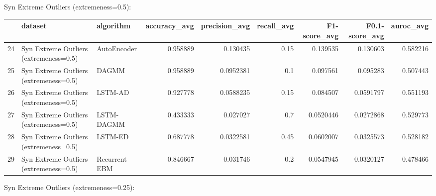 Syn Extreme Outliers (extremeness=0.5):

\begin{tabular}{rllrrrrrr}
\hline
    & dataset                                & algorithm     &   accuracy\_avg &   precision\_avg &   recall\_avg &   F1-score\_avg &   F0.1-score\_avg &   auroc\_avg \\
\hline
 24 & Syn Extreme Outliers (extremeness=0.5) & AutoEncoder   &       0.958889 &       0.130435  &         0.15 &      0.139535  &        0.130603  &    0.582216 \\
 25 & Syn Extreme Outliers (extremeness=0.5) & DAGMM         &       0.958889 &       0.0952381 &         0.1  &      0.097561  &        0.095283  &    0.507443 \\
 26 & Syn Extreme Outliers (extremeness=0.5) & LSTM-AD       &       0.927778 &       0.0588235 &         0.15 &      0.084507  &        0.0591797 &    0.551193 \\
 27 & Syn Extreme Outliers (extremeness=0.5) & LSTM-DAGMM    &       0.433333 &       0.027027  &         0.7  &      0.0520446 &        0.0272868 &    0.529773 \\
 28 & Syn Extreme Outliers (extremeness=0.5) & LSTM-ED       &       0.687778 &       0.0322581 &         0.45 &      0.0602007 &        0.0325573 &    0.528182 \\
 29 & Syn Extreme Outliers (extremeness=0.5) & Recurrent EBM &       0.846667 &       0.031746  &         0.2  &      0.0547945 &        0.0320127 &    0.478466 \\
\hline
\end{tabular}

Syn Extreme Outliers (extremeness=0.25):

